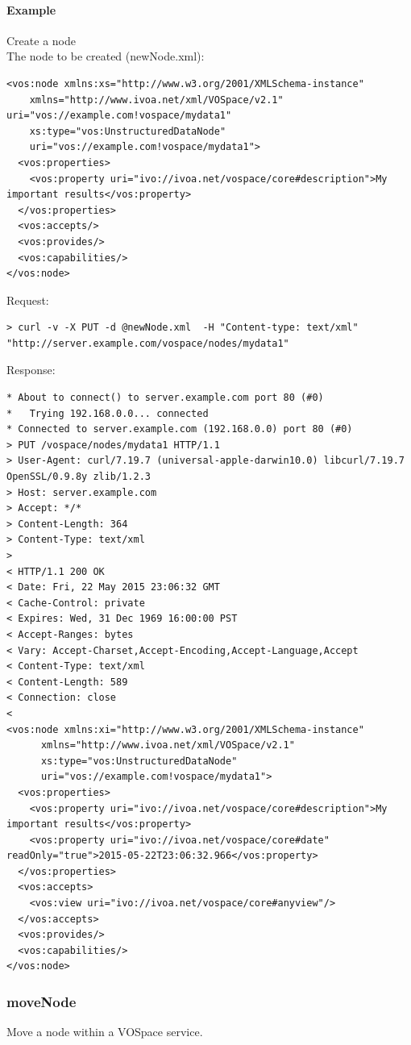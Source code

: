 \documentclass[11pt,a4paper]{ivoa}
\begin{document}
\paragraph{Example}
Create a node
\\[5px]
\noindent
The node to be created (newNode.xml):
\begin{lstlisting}
<vos:node xmlns:xs="http://www.w3.org/2001/XMLSchema-instance"
    xmlns="http://www.ivoa.net/xml/VOSpace/v2.1" uri="vos://example.com!vospace/mydata1"
    xs:type="vos:UnstructuredDataNode"
    uri="vos://example.com!vospace/mydata1">
  <vos:properties>
    <vos:property uri="ivo://ivoa.net/vospace/core#description">My important results</vos:property>
  </vos:properties>
  <vos:accepts/>
  <vos:provides/>
  <vos:capabilities/>
</vos:node>
\end{lstlisting}
Request:
\begin{lstlisting}
> curl -v -X PUT -d @newNode.xml  -H "Content-type: text/xml" "http://server.example.com/vospace/nodes/mydata1"
\end{lstlisting}
Response:
\begin{lstlisting}
* About to connect() to server.example.com port 80 (#0)
*   Trying 192.168.0.0... connected
* Connected to server.example.com (192.168.0.0) port 80 (#0)
> PUT /vospace/nodes/mydata1 HTTP/1.1
> User-Agent: curl/7.19.7 (universal-apple-darwin10.0) libcurl/7.19.7 OpenSSL/0.9.8y zlib/1.2.3
> Host: server.example.com
> Accept: */*
> Content-Length: 364
> Content-Type: text/xml
>
< HTTP/1.1 200 OK
< Date: Fri, 22 May 2015 23:06:32 GMT
< Cache-Control: private
< Expires: Wed, 31 Dec 1969 16:00:00 PST
< Accept-Ranges: bytes
< Vary: Accept-Charset,Accept-Encoding,Accept-Language,Accept
< Content-Type: text/xml
< Content-Length: 589
< Connection: close
<
<vos:node xmlns:xi="http://www.w3.org/2001/XMLSchema-instance"
      xmlns="http://www.ivoa.net/xml/VOSpace/v2.1"
      xs:type="vos:UnstructuredDataNode" 
      uri="vos://example.com!vospace/mydata1">
  <vos:properties>
    <vos:property uri="ivo://ivoa.net/vospace/core#description">My important results</vos:property>
    <vos:property uri="ivo://ivoa.net/vospace/core#date" readOnly="true">2015-05-22T23:06:32.966</vos:property>
  </vos:properties>
  <vos:accepts>
    <vos:view uri="ivo://ivoa.net/vospace/core#anyview"/>
  </vos:accepts>
  <vos:provides/>
  <vos:capabilities/>
</vos:node>
\end{lstlisting}

\subsubsection{moveNode}
\label{subsubsec:movenode}
Move a node within a VOSpace service.
\end{document}
